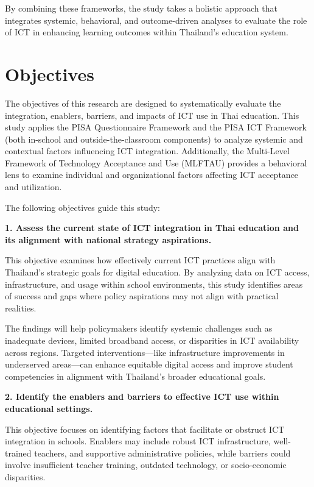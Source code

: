 \documentclass[
]{article}
\begin{document}
By combining these frameworks, the study takes a holistic approach that
integrates systemic, behavioral, and outcome-driven analyses to evaluate
the role of ICT in enhancing learning outcomes within Thailand's
education system.

\hypertarget{objectives}{%
\section{Objectives}\label{objectives}}

The objectives of this research are designed to systematically evaluate
the integration, enablers, barriers, and impacts of ICT use in Thai
education. This study applies the PISA Questionnaire Framework and the
PISA ICT Framework (both in-school and outside-the-classroom components)
to analyze systemic and contextual factors influencing ICT integration.
Additionally, the Multi-Level Framework of Technology Acceptance and Use
(MLFTAU) provides a behavioral lens to examine individual and
organizational factors affecting ICT acceptance and utilization.

The following objectives guide this study:

\textbf{1. Assess the current state of ICT integration in Thai education
and its alignment with national strategy aspirations.}

This objective examines how effectively current ICT practices align with
Thailand's strategic goals for digital education. By analyzing data on
ICT access, infrastructure, and usage within school environments, this
study identifies areas of success and gaps where policy aspirations may
not align with practical realities.

The findings will help policymakers identify systemic challenges such as
inadequate devices, limited broadband access, or disparities in ICT
availability across regions. Targeted interventions---like
infrastructure improvements in underserved areas---can enhance equitable
digital access and improve student competencies in alignment with
Thailand's broader educational goals.

\textbf{2. Identify the enablers and barriers to effective ICT use
within educational settings.}

This objective focuses on identifying factors that facilitate or
obstruct ICT integration in schools. Enablers may include robust ICT
infrastructure, well-trained teachers, and supportive administrative
policies, while barriers could involve insufficient teacher training,
outdated technology, or socio-economic disparities.
\end{document}
